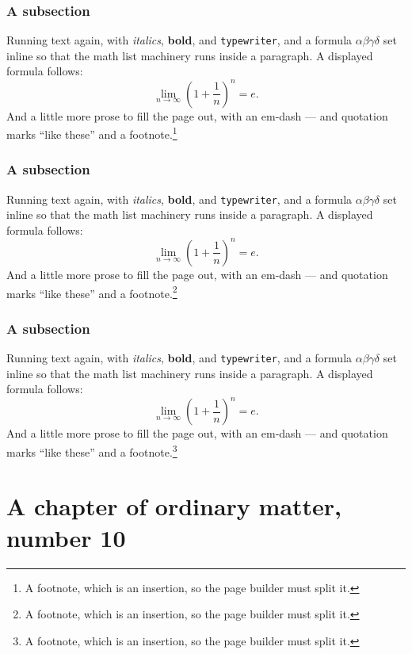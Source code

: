 \documentclass[11pt,a4paper]{report}
\theoremstyle{plain}
\begin{document}
\subsection{A subsection}
Running text again, with \textit{italics}, \textbf{bold}, and
\texttt{typewriter}, and a formula $\alpha\beta\gamma\delta$ set inline so
that the math list machinery runs inside a paragraph. A displayed formula
follows:
\[ \lim_{n\to\infty}\left(1+\frac{1}{n}\right)^{n}=e . \]
And a little more prose to fill the page out, with an em-dash --- and
quotation marks ``like these'' and a footnote.\footnote{A footnote, which is
an insertion, so the page builder must split it.}
\subsection{A subsection}
Running text again, with \textit{italics}, \textbf{bold}, and
\texttt{typewriter}, and a formula $\alpha\beta\gamma\delta$ set inline so
that the math list machinery runs inside a paragraph. A displayed formula
follows:
\[ \lim_{n\to\infty}\left(1+\frac{1}{n}\right)^{n}=e . \]
And a little more prose to fill the page out, with an em-dash --- and
quotation marks ``like these'' and a footnote.\footnote{A footnote, which is
an insertion, so the page builder must split it.}
\subsection{A subsection}
Running text again, with \textit{italics}, \textbf{bold}, and
\texttt{typewriter}, and a formula $\alpha\beta\gamma\delta$ set inline so
that the math list machinery runs inside a paragraph. A displayed formula
follows:
\[ \lim_{n\to\infty}\left(1+\frac{1}{n}\right)^{n}=e . \]
And a little more prose to fill the page out, with an em-dash --- and
quotation marks ``like these'' and a footnote.\footnote{A footnote, which is
an insertion, so the page builder must split it.}
\chapter{A chapter of ordinary matter, number 10}
\end{document}
